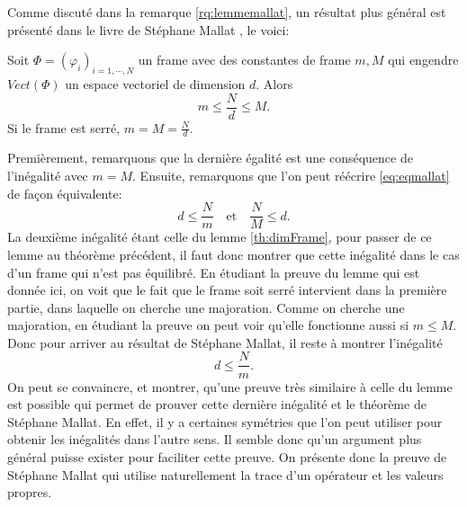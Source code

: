 Comme discuté dans la remarque \ref{rq:lemmemallat}, un résultat plus général est présenté dans le livre de Stéphane Mallat \cite{mallatframe}, le voici:
\begin{theoreme}[Mallat]
	Soit $\Phi =(\varphi_i)_{i=1, \cdots, N}$ un frame avec des constantes de frame $m,M$ qui engendre $Vect(\Phi)$ un espace vectoriel de dimension $d$.
	Alors
	\begin{equation}\label{eq:eqmallat}
		m \leq \frac{N}{d} \leq M.
	\end{equation}
	Si le frame est serré, $m=M=\frac{N}{d}$.
\end{theoreme}
Premièrement, remarquons que la dernière égalité est une conséquence de l'inégalité avec $m=M$.
\newline 
Ensuite, remarquons que l'on peut réécrire \ref{eq:eqmallat} de façon équivalente:
	\begin{equation}
		d \leq \frac{N}{m} \quad \text{et} \quad \frac{N}{M} \leq d.
	\end{equation}
	La deuxième inégalité étant celle du lemme \ref{th:dimFrame}, pour passer de ce lemme au théorème précédent, il faut donc montrer que cette inégalité dans le cas d'un frame qui n'est pas équilibré.
	En étudiant la preuve du lemme qui est donnée ici, on voit que le fait que le frame soit serré intervient dans la première partie, dans laquelle on cherche une majoration.
	Comme on cherche une majoration, en étudiant la preuve on peut voir qu'elle fonctionne aussi si $m\leq M$.
	Donc pour arriver au résultat de Stéphane Mallat, il reste à montrer l'inégalité
	\begin{equation}
		d \leq \frac{N}{m}.
	\end{equation}
	On peut se convaincre, et montrer, qu'une preuve très similaire à celle du lemme est possible qui permet de prouver cette dernière inégalité et le théorème de Stéphane Mallat.
	En effet, il y a certaines symétries que l'on peut utiliser pour obtenir les inégalités dans l'autre sens. 
	Il semble donc qu'un argument plus général puisse exister pour faciliter cette preuve.
	On présente donc la preuve de Stéphane Mallat qui utilise naturellement la trace d'un opérateur et les valeurs propres.
